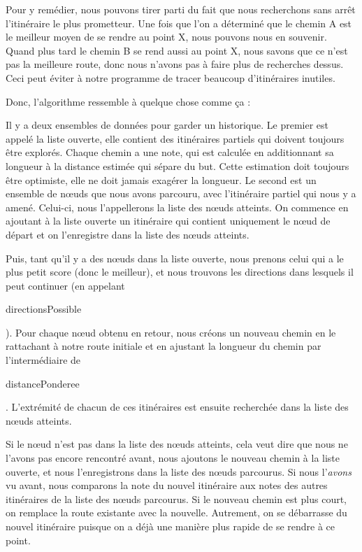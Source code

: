 \documentclass{FramateX}
\renewcommand{\texttt}[1]{\begin{sffamily}{#1}\end{sffamily}}
\begin{document}
Pour y remédier, nous pouvons tirer parti du fait que nous recherchons
sans arrêt l'itinéraire le plus prometteur. Une fois que l'on a
déterminé que le chemin A est le meilleur moyen de se rendre au point X,
nous pouvons nous en souvenir. Quand plus tard le chemin B se rend aussi
au point X, nous savons que ce n'est pas la meilleure route, donc nous
n'avons pas à faire plus de recherches dessus. Ceci peut éviter à notre
programme de tracer beaucoup d'itinéraires inutiles.

\begin{center}\end{center}

Donc, l'algorithme ressemble à quelque chose comme ça :

Il y a deux ensembles de données pour garder un historique. Le premier
est appelé la liste ouverte, elle contient des itinéraires partiels qui
doivent toujours être explorés. Chaque chemin a une note, qui est
calculée en additionnant sa longueur à la distance estimée qui sépare du
but. Cette estimation doit toujours être optimiste, elle ne doit jamais
exagérer la longueur. Le second est un ensemble de nœuds que nous avons
parcouru, avec l'itinéraire partiel qui nous y a amené. Celui-ci, nous
l'appellerons la liste des nœuds atteints. On commence en ajoutant à la
liste ouverte un itinéraire qui contient uniquement le nœud de départ et
on l'enregistre dans la liste des nœuds atteints.

Puis, tant qu'il y a des nœuds dans la liste ouverte, nous prenons celui
qui a le plus petit score (donc le meilleur), et nous trouvons les
directions dans lesquels il peut continuer (en appelant
\texttt{directionsPossible}). Pour chaque nœud obtenu en retour, nous
créons un nouveau chemin en le rattachant à notre route initiale et en
ajustant la longueur du chemin par l'intermédiaire de
\texttt{distancePonderee}. L'extrémité de chacun de ces itinéraires est
ensuite recherchée dans la liste des nœuds atteints.

Si le nœud n'est pas dans la liste des nœuds atteints, cela veut dire
que nous ne l'avons pas encore rencontré avant, nous ajoutons le nouveau
chemin à la liste ouverte, et nous l'enregistrons dans la liste des
nœuds parcourus. Si nous l'\emph{avons} vu avant, nous comparons la note
du nouvel itinéraire aux notes des autres itinéraires de la liste des
nœuds parcourus. Si le nouveau chemin est plus court, on remplace la
route existante avec la nouvelle. Autrement, on se débarrasse du nouvel
itinéraire puisque on a déjà une manière plus rapide de se rendre à ce
point.
\end{document}
